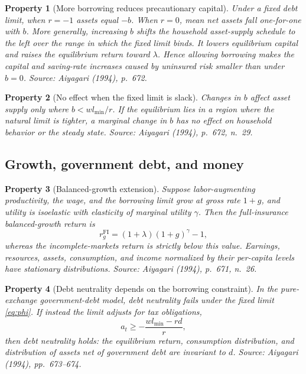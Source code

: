 \documentclass[11pt]{article}
\theoremstyle{propertystyle}
\newtheorem{property}{Property}
\newcommand{\1}{\mathbf{1}}
\begin{document}
\begin{property}[More borrowing reduces precautionary capital]
Under a fixed debt limit, when $r=-1$ assets equal $-b$.  When $r=0$, mean net
assets fall one-for-one with $b$.  More generally, increasing $b$ shifts the
household asset-supply schedule to the left over the range in which the fixed
limit binds.  It lowers equilibrium capital and raises the equilibrium return
toward $\lambda$.  Hence allowing borrowing makes the capital and saving-rate
increases caused by uninsured risk smaller than under $b=0$.
\emph{Source: Aiyagari (1994), p.~672.}
\end{property}

\begin{property}[No effect when the fixed limit is slack]
Changes in $b$ affect asset supply only where $b<wl_{\min}/r$.  If the
equilibrium lies in a region where the natural limit is tighter, a marginal
change in $b$ has no effect on household behavior or the steady state.
\emph{Source: Aiyagari (1994), p.~672, n.~29.}
\end{property}

\subsection{Growth, government debt, and money}

\begin{property}[Balanced-growth extension]
Suppose labor-augmenting productivity, the wage, and the borrowing limit grow
at gross rate $1+g$, and utility is isoelastic with elasticity of marginal
utility $\gamma$.  Then the full-insurance balanced-growth return is
\[
  r^{\mathrm{FI}}_g=(1+\lambda)(1+g)^{\gamma}-1,
\]
whereas the incomplete-markets return is strictly below this value.  Earnings,
resources, assets, consumption, and income normalized by their per-capita
levels have stationary distributions.  \emph{Source: Aiyagari (1994), p.~671,
n.~26.}
\end{property}

\begin{property}[Debt neutrality depends on the borrowing constraint]
In the pure-exchange government-debt model, debt neutrality fails under the
fixed limit \cref{eq:phi}.  If instead the limit adjusts for tax obligations,
\[
  a_t\geq-\frac{wl_{\min}-rd}{r},
\]
then debt neutrality holds: the equilibrium return, consumption distribution,
and distribution of assets net of government debt are invariant to $d$.
\emph{Source: Aiyagari (1994), pp.~673--674.}
\end{property}
\end{document}
